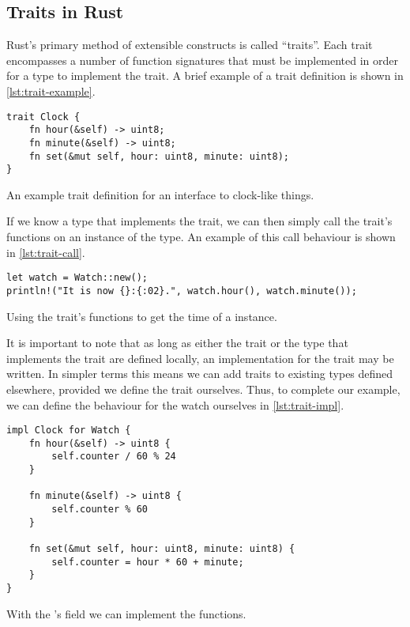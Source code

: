\subsection{Traits in Rust}
Rust's primary method of extensible constructs is called ``traits''. Each trait encompasses a number of function signatures that must be implemented in order for a type to implement the trait. A brief example of a trait definition is shown in \autoref{lst:trait-example}. \\

\begin{listing}[H]
\begin{verbatim}
trait Clock {
    fn hour(&self) -> uint8;
    fn minute(&self) -> uint8;
    fn set(&mut self, hour: uint8, minute: uint8);
}
\end{verbatim}
\caption{An example trait definition for an interface to clock-like things.}
\label{lst:trait-example}
\end{listing}

If we know a type that implements the trait, we can then simply call the trait's functions on an instance of the type. An example of this call behaviour is shown in \autoref{lst:trait-call}.

\begin{listing}[H]
\begin{verbatim}
let watch = Watch::new();
println!("It is now {}:{:02}.", watch.hour(), watch.minute());
\end{verbatim}
\caption{Using the  trait's functions to get the time of a  instance.}
\label{lst:trait-call}
\end{listing}

It is important to note that as long as either the trait or the type that implements the trait are defined locally, an implementation for the trait may be written. In simpler terms this means we can add traits to existing types defined elsewhere, provided we define the trait ourselves. Thus, to complete our example, we can define the behaviour for the watch ourselves in \autoref{lst:trait-impl}.

\begin{listing}[H]
\begin{verbatim}
impl Clock for Watch {
    fn hour(&self) -> uint8 {
        self.counter / 60 % 24
    }
  
    fn minute(&self) -> uint8 {
        self.counter % 60
    }
  
    fn set(&mut self, hour: uint8, minute: uint8) {
        self.counter = hour * 60 + minute;
    }
}
\end{verbatim}
\caption{With the 's  field we can implement the  functions.}
\label{lst:trait-impl}
\end{listing}

